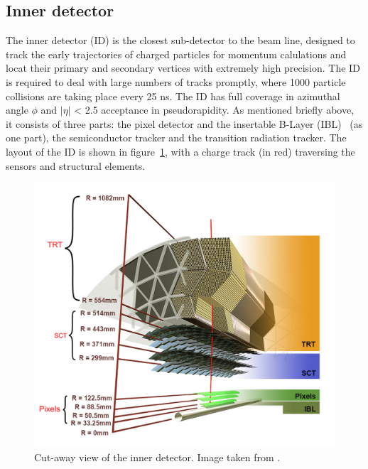 \subsection{Inner detector}	
\label{sec:inner detector}
The inner detector (ID) is the closest sub-detector to the
beam line, designed to track the early trajectories of charged particles for
momentum calulations and locat their primary and secondary vertices with
extremely high precision. The ID is required to deal with large numbers of tracks
promptly, where 1000 particle collisions are taking place every 25 ns.  
The ID has full coverage in azimuthal angle $\phi$ and $|\eta|$ < 2.5 acceptance 
in pseudorapidity. As mentioned briefly above, it consists of three parts: 
the pixel detector and the insertable B-Layer (IBL)~\cite{ATLAS-TDR-19} (as one part),
the semiconductor tracker and the transition radiation
tracker. The layout of the ID is shown in figure~\ref{fig:inner_detector},
with a charge track (in red) traversing the sensors and structural elements. 
\begin{figure}[bht]
	\begin{centering}	
	\includegraphics[width=.85\textwidth]{Detector_plots/Inner detector.png}
	\caption{Cut-away view of the inner detector. Image taken from \cite{Pequenao}.}
	\label{fig:inner_detector}
\end{centering}
\end{figure}
